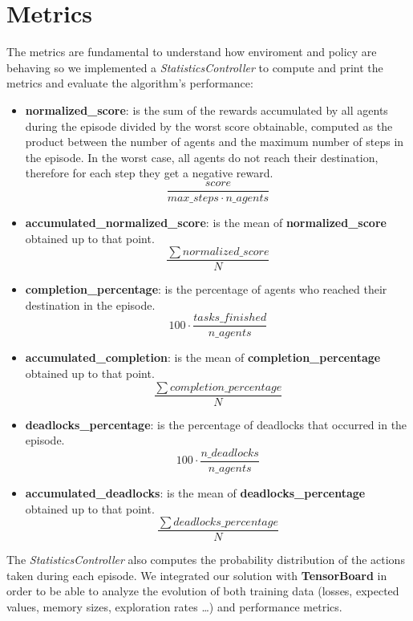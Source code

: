 \section{Metrics}
\label{sec:metrics}
The metrics are fundamental to understand how enviroment and policy are behaving so we implemented a \textit{StatisticsController} to compute and print the metrics and evaluate the algorithm’s performance:
\begin{itemize}
	\item \textbf{normalized\_score}: is the sum of the rewards accumulated by all agents during the episode divided by the worst score obtainable, computed as the product between the number of agents and the maximum number of steps in the episode.
	In the worst case, all agents do not reach their destination, therefore for each step they get a negative reward.
	\begin{equation}{\frac{score}{max\_steps \cdot n\_agents}}\label{eq:score}\end{equation}
	\item \textbf{accumulated\_normalized\_score}: is the mean of \textbf{normalized\_score} obtained up to that point.
	\begin{equation}{\frac{\sum{normalized\_score}}{N}}\label{eq:score_acc}\end{equation}
	\item \textbf{completion\_percentage}: is the percentage of agents who reached their destination in the episode.
	\begin{equation}{100 \cdot {\frac{tasks\_finished}{n\_agents}}}\label{eq:compl_perc}\end{equation}
	\item \textbf{accumulated\_completion}: is the mean of \textbf{completion\_percentage} obtained up to that point.
	\begin{equation}{\frac{\sum{completion\_percentage}}{N}}\label{eq:compl_acc}\end{equation}
	\item \textbf{deadlocks\_percentage}: is the percentage of deadlocks that occurred in the episode.
	\begin{equation}{100 \cdot {\frac{n\_deadlocks}{n\_agents}}}\label{eq:deads_perc}\end{equation}
	\item \textbf{accumulated\_deadlocks}: is the mean of \textbf{deadlocks\_percentage} obtained up to that point.
	\begin{equation}{\frac{\sum {deadlocks\_percentage}}{N}}\label{eq:deads_acc}\end{equation}
\end{itemize}
The \textit{StatisticsController} also computes the probability distribution of the actions taken during each episode.
We integrated our solution with \textbf{TensorBoard} in order to be able to analyze the evolution of both training data (losses, expected values, memory sizes, exploration rates \ldots) and performance metrics.

